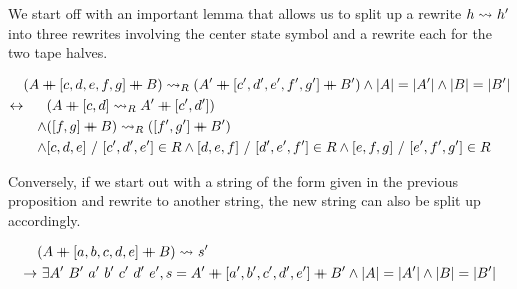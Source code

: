 We start off with an important lemma that allows us to split up a rewrite $h \rightsquigarrow_{} h'$ into three rewrites involving the center state symbol and a rewrite each for the two tape halves.
\begin{proposition}\label{lem:rewrite_split}
  \begin{align*}
    &(A \concat [c, d, e, f, g] \concat B) \strent{R} (A' \concat [c', d', e', f', g'] \concat B') \land \length{A} = \length{A'} \land \length{B} = \length{B'} \\
    \leftrightarrow& \quad
    \begin{aligned}[t]
      &(A \concat [c, d] \strent{R} A' \concat [c', d']) \\
      \land& ([f, g] \concat B) \strent{R} ([f', g'] \concat B') \\
      \land& \irewwin{c}{d}{e}{c'}{d'}{e'} \in R \land \irewwin{d}{e}{f}{d'}{e'}{f'} \in R\land \irewwin{e}{f}{g}{e'}{f'}{g'}\in R
    \end{aligned}
  \end{align*}
\end{proposition}

Conversely, if we start out with a string of the form given in the previous proposition and rewrite to another string, the new string can also be split up accordingly. 
\begin{proposition}\label{prop:rewrite_split_conv}
  \begin{align*}
    &(A \concat [a, b, c, d, e] \concat B) \strent{} s' \\
    \rightarrow &~\exists A'~B'~a'~b'~c'~d'~e', s = A' \concat [a', b', c', d', e'] \concat B' \land \length{A} = \length{A'} \land \length{B} = \length{B'}
  \end{align*}
\end{proposition}

